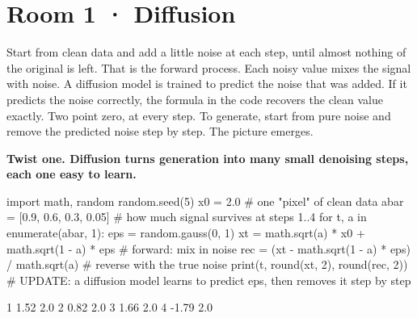 \documentclass[11pt,a4paper]{report}
\begin{document}
\section*{Room 1 · Diffusion}
Start from clean data and add a little noise at each step, until almost nothing of the original is left. That is the forward process. Each noisy value mixes the signal with noise. A diffusion model is trained to predict the noise that was added. If it predicts the noise correctly, the formula in the code recovers the clean value exactly. Two point zero, at every step. To generate, start from pure noise and remove the predicted noise step by step. The picture emerges.
\begin{tcolorbox}[colback=yellow!12,colframe=orange!70!black,boxrule=0.4pt,left=4pt,right=4pt,top=2pt,bottom=2pt]\textbf{Twist one. Diffusion turns generation into many small denoising steps, each one easy to learn.}\end{tcolorbox}
\begin{Code}
import math, random
random.seed(5)
x0 = 2.0                                    # one "pixel" of clean data
abar = [0.9, 0.6, 0.3, 0.05]                # how much signal survives at steps 1..4
for t, a in enumerate(abar, 1):
    eps = random.gauss(0, 1)
    xt = math.sqrt(a) * x0 + math.sqrt(1 - a) * eps         # forward: mix in noise
    rec = (xt - math.sqrt(1 - a) * eps) / math.sqrt(a)      # reverse with the true noise
    print(t, round(xt, 2), round(rec, 2))
# UPDATE: a diffusion model learns to predict eps, then removes it step by step
\end{Code}
\begin{Out}
1 1.52 2.0
2 0.82 2.0
3 1.66 2.0
4 -1.79 2.0
\end{Out}
\end{document}
